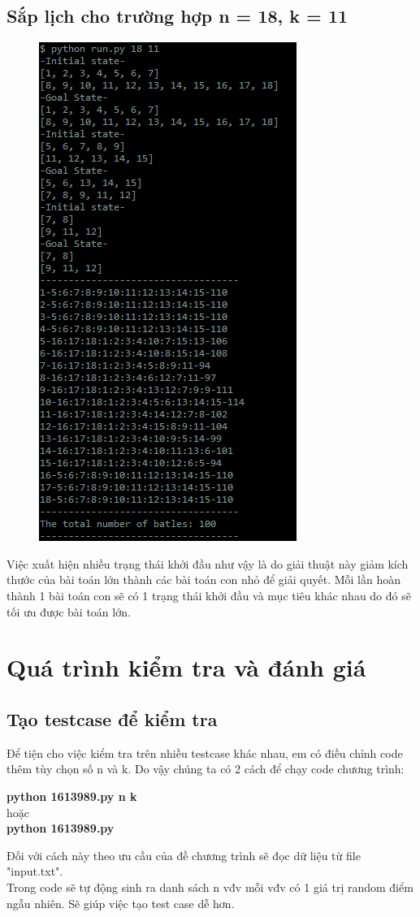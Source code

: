 \documentclass[13pt,a4paper]{article}
\begin{document}
\subsection{Sắp lịch cho trường hợp n = 18, k = 11}
	\begin{figure}[H]
		\centering
		\includegraphics[scale=0.5]{./image/kq2.png}
	\end{figure}
	Việc xuất hiện nhiều trạng thái khởi đầu như vậy là do giải thuật này giảm kích thước của bài toán lớn thành các bài toán con nhỏ để giải quyết. Mỗi lần hoàn thành 1 bài toán con sẽ có 1 trạng thái khởi đầu và mục tiêu khác nhau do đó sẽ tối ưu được bài toán lớn.
	
\section{Quá trình kiểm tra và đánh giá}
	\subsection{Tạo testcase để kiểm tra}
	Để tiện cho việc kiểm tra trên nhiều testcase khác nhau, em có điều chỉnh code thêm tùy chọn số n và k. Do vậy chúng ta có 2 cách để chạy code chương trình:
	\begin{center}
		\textbf{python 1613989.py n k }\\
		hoặc\\[0.2cm]
		\textbf{python 1613989.py}\\
		
	\end{center}		
	Đối với cách này theo ưu cầu của đề chương trình sẽ đọc dữ liệu từ file "input.txt".\\
	Trong code sẽ tự động sinh ra danh sách n vđv mỗi vđv có 1 giá trị random điểm ngẫu nhiên. Sẽ giúp việc tạo test case dễ hơn. 
\end{document}
